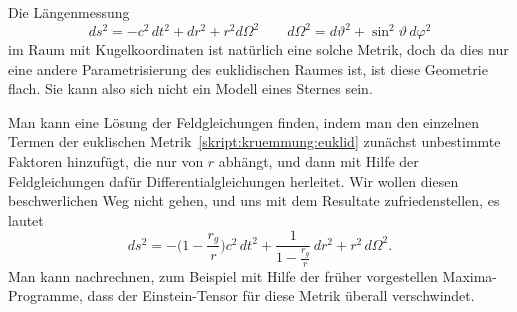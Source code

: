Die Längenmessung
\begin{equation}
ds^2
=
-c^2\,dt^2 + dr^2 + r^2 d\Omega^2
\qquad
d\Omega^2 = d\vartheta^2 + \sin^2\vartheta\,d\varphi^2
\label{skript:kruemmung:euklid}
\end{equation}
im Raum mit Kugelkoordinaten ist natürlich eine solche Metrik,
doch da dies nur eine andere Parametrisierung des euklidischen
Raumes ist, ist diese Geometrie flach.
Sie kann also sich nicht ein Modell eines Sternes sein.

Man kann eine Lösung der Feldgleichungen finden, indem man den
einzelnen Termen der euklischen Metrik~\eqref{skript:kruemmung:euklid}
zunächst unbestimmte Faktoren hinzufügt, die nur von $r$ abhängt,
und dann mit Hilfe der Feldgleichungen dafür Differentialgleichungen
herleitet.
Wir wollen diesen beschwerlichen Weg nicht gehen, und uns mit dem
Resultate zufriedenstellen, es lautet
\begin{equation}
ds^2
=
-\biggl(1-\frac{r_g}r\biggr)c^2\,dt^2
+\frac1{\displaystyle 1-\frac{r_g}r}\,dr^2 + r^2\,d\Omega^2.
\end{equation}
Man kann nachrechnen, zum Beispiel mit Hilfe der früher vorgestellen
Maxima-Programme, dass der Einstein-Tensor für diese Metrik überall
verschwindet.

